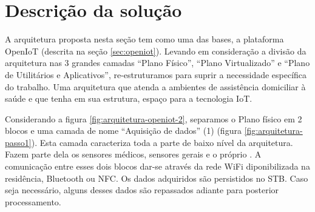 


\section{Descrição da solução}
\label{sec:descricao-solucao}

A arquitetura proposta nesta seção tem como uma das bases, a plataforma OpenIoT
(descrita na seção \vref{sec:openiot}). Levando em consideração a divisão da
arquitetura nas 3 grandes camadas ``Plano Físico'', ``Plano Virtualizado'' e
``Plano de Utilitários e Aplicativos'', re-estruturamos para suprir a
necessidade específica do trabalho. Uma arquitetura que atenda a ambientes de
assistência domiciliar à saúde e que tenha em sua estrutura, espaço para a
tecnologia IoT.

Considerando a figura \ref{fig:arquitetura-openiot-2}, separamos o Plano físico
em 2 blocos e uma camada de nome ``Aquisição de dados'' (1) (figura
\ref{fig:arquitetura-passo1}). Esta camada caracteriza toda a parte de baixo
nível da arquitetura. Fazem parte dela os sensores médicos, sensores gerais e o
próprio \stb[]. A comunicação entre esses dois blocos dar-se através da rede
WiFi diponibilizada na residência, Bluetooth ou NFC. Os dados adquiridos são
persistidos no STB. Caso seja necessário, alguns desses dados são
repassados adiante para posterior processamento. 

